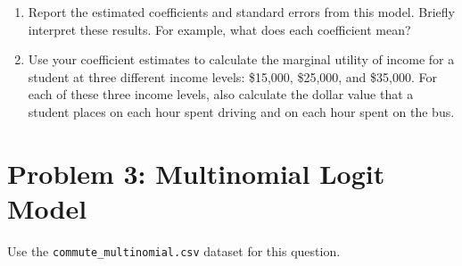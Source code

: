 \documentclass[11pt,letterpaper]{article}
\begin{document}
\begin{enumerate}[label=\alph*., leftmargin=*]
	\begin{enumerate}[label=\roman*.]
		\item Report the estimated coefficients and standard errors from this model. Briefly interpret these results. For example, what does each coefficient mean?

		\item Use your coefficient estimates to calculate the marginal utility of income for a student at three different income levels: \$15,000, \$25,000, and \$35,000. For each of these three income levels, also calculate the dollar value that a student places on each hour spent driving and on each hour spent on the bus.
	\end{enumerate}
\end{enumerate}

\section*{Problem 3: Multinomial Logit Model}

Use the \texttt{commute\_multinomial.csv} dataset for this question.
\end{document}
